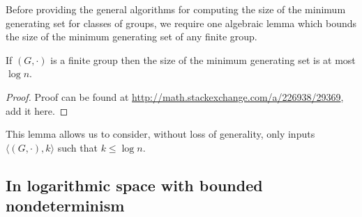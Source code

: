 \documentclass{article}
\begin{document}
Before providing the general algorithms for computing the size of the minimum generating set for classes of groups, we require one algebraic lemma which bounds the size of the minimum generating set of any finite group.

\begin{lemma}\label{lem:log}
  If $(G, \cdot)$ is a finite group then the size of the minimum generating set is at most $\log n$.
\end{lemma}
\begin{proof}
  Proof can be found at \url{http://math.stackexchange.com/a/226938/29369}, add it here.
\end{proof}

This lemma allows us to consider, without loss of generality, only inputs $\langle (G, \cdot), k \rangle$ such that $k \leq \log n$.

\subsection{In logarithmic space with bounded nondeterminism}
\end{document}

